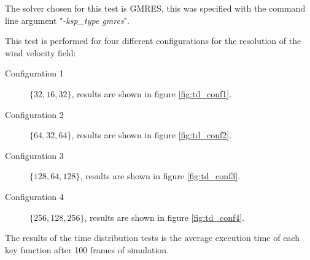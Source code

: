 The solver chosen for this test is GMRES, this was specified with the command
line argument "\emph{-ksp\_type gmres}".

This test is performed for four different configurations for the resolution of
the wind velocity field:
\begin{description}
	\item[Configuration 1] $ \{ 32, 16, 32 \} $, results are shown in figure
		\ref{fig:td_conf1}.
	\item[Configuration 2] $ \{ 64, 32, 64 \} $, results are shown in figure
		\ref{fig:td_conf2}.
	\item[Configuration 3] $ \{ 128, 64, 128 \} $, results are shown in figure
		\ref{fig:td_conf3}.
	\item[Configuration 4] $ \{ 256, 128, 256 \} $, results are shown in figure
		\ref{fig:td_conf4}.
\end{description}

The results of the time distribution tests is the average execution time of each
key function after 100 frames of simulation.


